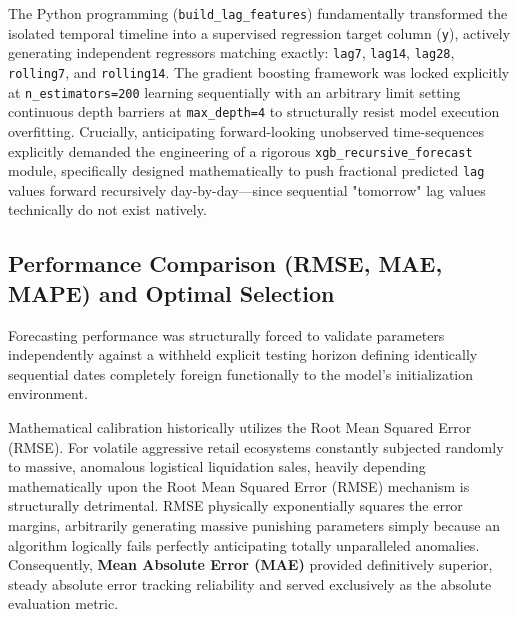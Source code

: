 \documentclass[12pt,a4paper]{report}
\begin{document}
The Python programming (\texttt{build\_lag\_features}) fundamentally transformed the isolated temporal timeline into a supervised regression target column (\texttt{y}), actively generating independent regressors matching exactly: \texttt{lag7}, \texttt{lag14}, \texttt{lag28}, \texttt{rolling7}, and \texttt{rolling14}. The gradient boosting framework was locked explicitly at \texttt{n\_estimators=200} learning sequentially with an arbitrary limit setting continuous depth barriers at \texttt{max\_depth=4} to structurally resist model execution overfitting. Crucially, anticipating forward-looking unobserved time-sequences explicitly demanded the engineering of a rigorous \texttt{xgb\_recursive\_forecast} module, specifically designed mathematically to push fractional predicted \texttt{lag} values forward recursively day-by-day—since sequential "tomorrow" lag values technically do not exist natively.

\subsection{Performance Comparison (RMSE, MAE, MAPE) and Optimal Selection}
Forecasting performance was structurally forced to validate parameters independently against a withheld explicit testing horizon defining identically sequential dates completely foreign functionally to the model's initialization environment.

Mathematical calibration historically utilizes the Root Mean Squared Error (RMSE). For volatile aggressive retail ecosystems constantly subjected randomly to massive, anomalous logistical liquidation sales, heavily depending mathematically upon the Root Mean Squared Error (RMSE) mechanism is structurally detrimental. RMSE physically exponentially squares the error margins, arbitrarily generating massive punishing parameters simply because an algorithm logically fails perfectly anticipating totally unparalleled anomalies. Consequently, \textbf{Mean Absolute Error (MAE)} provided definitively superior, steady absolute error tracking reliability and served exclusively as the absolute evaluation metric.
\end{document}
